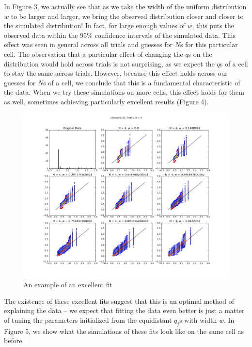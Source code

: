 \documentclass{article}
\begin{document}
In Figure 3, we actually see that as we take the width of the uniform distribution $w$ to be larger and larger, we bring the observed distribution closer and closer to the simulated distribution! In fact, for large enough values of $w$, this puts the observed data within the $95\%$ confidence intervals of the simulated data. This effect was seen in general across all trials and guesses for $N$s for this particular cell. The observation that a particular effect of changing the $q$s on the distribution would hold across trials is not surprising, as we expect the $q$s of a cell to stay the same across trials. However, because this effect holds across our guesses for $N$s of a cell, we conclude that this is a fundamental characteristic of the data. When we try these simulations on more cells, this effect holds for them as well, sometimes achieving particularly excellent results (Figure 4).

\begin{figure}[h]
  \centering
  \caption{An example of an excellent fit}
  \includegraphics[width=1.0\textwidth]{23sept2015c-1-4-qq}
\end{figure}

The existence of these excellent fits suggest that this is an optimal method of explaining the data -- we expect that fitting the data even better is just a matter of tuning the parameters initialized from the equidistant $q_j$s with width $w$. In Figure 5, we show what the simulations of these fits look like on the same cell as before.
\end{document}
